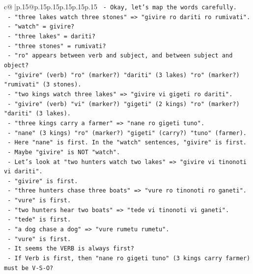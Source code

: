 \documentclass{article}
\begin{document}
{\begin{supertabular}{c@{$\;$}|p{.15\linewidth}@{}p{.15\linewidth}p{.15\linewidth}p{.15\linewidth}p{.15\linewidth}p{.15\linewidth}}
{{{\texttt{            {-} Okay, let's map the words carefully.} \\
\texttt{            {-} "three lakes watch three stones" => "givire ro dariti ro rumivati".} \\
\texttt{              {-} "watch" = givire?} \\
\texttt{              {-} "three lakes" = dariti?} \\
\texttt{              {-} "three stones" = rumivati?} \\
\texttt{              {-} "ro" appears between verb and subject, and between subject and object?} \\
\texttt{              {-} "givire" (verb) "ro" (marker?) "dariti" (3 lakes) "ro" (marker?) "rumivati" (3 stones).} \\
\texttt{            {-} "two kings watch three lakes" => "givire vi gigeti ro dariti".} \\
\texttt{              {-} "givire" (verb) "vi" (marker?) "gigeti" (2 kings) "ro" (marker?) "dariti" (3 lakes).} \\
\texttt{            {-} "three kings carry a farmer" => "nane ro gigeti tuno".} \\
\texttt{              {-} "nane" (3 kings) "ro" (marker?) "gigeti" (carry?) "tuno" (farmer).} \\
\texttt{              {-} Here "nane" is first. In the "watch" sentences, "givire" is first.} \\
\texttt{              {-} Maybe "givire" is NOT "watch".} \\
\texttt{              {-} Let's look at "two hunters watch two lakes" => "givire vi tinonoti vi dariti".} \\
\texttt{                {-} "givire" is first.} \\
\texttt{              {-} "three hunters chase three boats" => "vure ro tinonoti ro ganeti".} \\
\texttt{                {-} "vure" is first.} \\
\texttt{              {-} "two hunters hear two boats" => "tede vi tinonoti vi ganeti".} \\
\texttt{                {-} "tede" is first.} \\
\texttt{              {-} "a dog chase a dog" => "vure rumetu rumetu".} \\
\texttt{                {-} "vure" is first.} \\
\texttt{              {-} It seems the VERB is always first?} \\
\texttt{              {-} If Verb is first, then "nane ro gigeti tuno" (3 kings carry farmer) must be V{-}S{-}O?} \\
}}}
\end{supertabular}}
\end{document}
